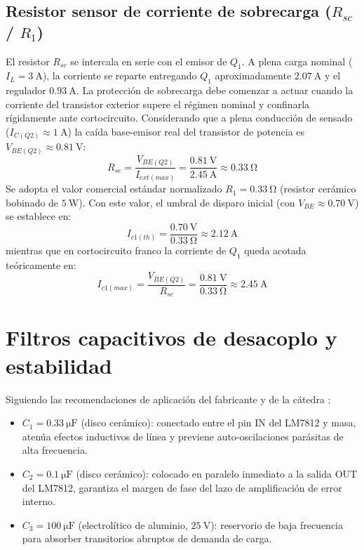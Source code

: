 \subsection{Resistor sensor de corriente de sobrecarga ($R_{sc}$ / $R_1$)}
El resistor $R_{sc}$ se intercala en serie con el emisor de $Q_1$. A plena carga nominal ($I_L = \SI{3}{\ampere}$), la
corriente se reparte entregando $Q_1$ aproximadamente $\SI{2.07}{\ampere}$ y el regulador $\SI{0.93}{\ampere}$.
La protección de sobrecarga debe comenzar a actuar cuando la corriente del transistor exterior supere el régimen
nominal y confinarla rígidamente ante cortocircuito.
Considerando que a plena conducción de sensado ($I_{C(Q2)} \approx \SI{1}{\ampere}$) la caída base-emisor real del
transistor de potencia es $V_{BE(Q2)} \approx \SI{0.81}{\volt}$:
\begin{equation*}
    R_{sc} = \frac{V_{BE(Q2)}}{I_{ext(max)}} = \frac{\SI{0.81}{\volt}}{\SI{2.45}{\ampere}} \approx \SI{0.33}{\ohm}
\end{equation*}
Se adopta el valor comercial estándar normalizado $R_1 = \SI{0.33}{\ohm}$ (resistor cerámico bobinado de $\SI{5}{\watt}$).
Con este valor, el umbral de disparo inicial (con $V_{BE} \approx \SI{0.70}{\volt}$) se establece en:
\begin{equation*}
    I_{c1(th)} = \frac{\SI{0.70}{\volt}}{\SI{0.33}{\ohm}} \approx \SI{2.12}{\ampere}
\end{equation*}
mientras que en cortocircuito franco la corriente de $Q_1$ queda acotada teóricamente en:
\begin{equation*}
    I_{c1(max)} = \frac{V_{BE(Q2)}}{R_{sc}} = \frac{\SI{0.81}{\volt}}{\SI{0.33}{\ohm}} \approx \SI{2.45}{\ampere}
\end{equation*}

\section{Filtros capacitivos de desacoplo y estabilidad}
\label{sec.c5:capacitores}

Siguiendo las recomendaciones de aplicación del fabricante y de la cátedra
\cite{gonzalez_fuentes2}:
\begin{itemize}
    \item $C_1 = \SI{0.33}{\micro\farad}$ (disco cerámico): conectado entre el pin IN del LM7812 y masa, atenúa
    efectos inductivos de línea y previene auto-oscilaciones parásitas de alta frecuencia.
    \item $C_2 = \SI{0.1}{\micro\farad}$ (disco cerámico): colocado en paralelo inmediato a la salida OUT del
    LM7812, garantiza el margen de fase del lazo de amplificación de error interno.
    \item $C_3 = \SI{100}{\micro\farad}$ (electrolítico de aluminio, $\SI{25}{\volt}$): reservorio de baja
    frecuencia para absorber transitorios abruptos de demanda de carga.
\end{itemize}

